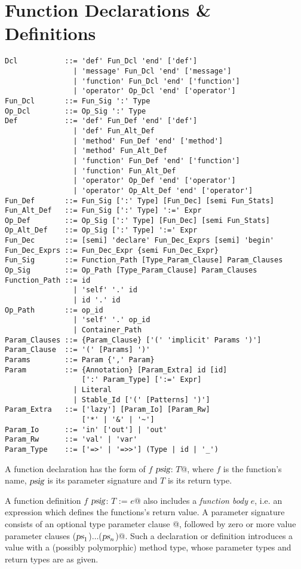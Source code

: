 \section{Function Declarations \& Definitions}
\label{sec:function-decls-defs}

\syntax\begin{lstlisting}
Dcl           ::= 'def' Fun_Dcl 'end' ['def']
                | 'message' Fun_Dcl 'end' ['message']
                | 'function' Fun_Dcl 'end' ['function']
                | 'operator' Op_Dcl 'end' ['operator']
Fun_Dcl       ::= Fun_Sig ':' Type
Op_Dcl        ::= Op_Sig ':' Type
Def           ::= 'def' Fun_Def 'end' ['def']
                | 'def' Fun_Alt_Def
                | 'method' Fun_Def 'end' ['method']
                | 'method' Fun_Alt_Def
                | 'function' Fun_Def 'end' ['function']
                | 'function' Fun_Alt_Def
                | 'operator' Op_Def 'end' ['operator']
                | 'operator' Op_Alt_Def 'end' ['operator']
Fun_Def       ::= Fun_Sig [':' Type] [Fun_Dec] [semi Fun_Stats]
Fun_Alt_Def   ::= Fun_Sig [':' Type] ':=' Expr
Op_Def        ::= Op_Sig [':' Type] [Fun_Dec] [semi Fun_Stats]
Op_Alt_Def    ::= Op_Sig [':' Type] ':=' Expr
Fun_Dec       ::= [semi] 'declare' Fun_Dec_Exprs [semi] 'begin'
Fun_Dec_Exprs ::= Fun_Dec_Expr {semi Fun_Dec_Expr}
Fun_Sig       ::= Function_Path [Type_Param_Clause] Param_Clauses
Op_Sig        ::= Op_Path [Type_Param_Clause] Param_Clauses
Function_Path ::= id
                | 'self' '.' id
                | id '.' id
Op_Path       ::= op_id
                | 'self' '.' op_id
                | Container_Path
Param_Clauses ::= {Param_Clause} ['(' 'implicit' Params ')']
Param_Clause  ::= '(' [Params] ')'
Params        ::= Param {',' Param}
Param         ::= {Annotation} [Param_Extra] id [id]
                  [':' Param_Type] [':=' Expr]
                | Literal
                | Stable_Id ['(' [Patterns] ')']
Param_Extra   ::= ['lazy'] [Param_Io] [Param_Rw] 
                  ['*' | '&' | '~']
Param_Io      ::= 'in' ['out'] | 'out'
Param_Rw      ::= 'val' | 'var'
Param_Type    ::= ['=>' | '=>>'] (Type | id | '_')
\end{lstlisting}

A function declaration has the form of \lstinline@def $f$ $\mbox{\sl psig}$: $T$@, where $f$ is the function's name, $\mbox{\sl psig}$ is its parameter signature and $T$ is its return type. 

A function definition \lstinline@def $f$ $\mbox{\sl psig}$: $T$ := $e$@ also includes a {\em function body} $e$, i.e. an expression which defines the functions's return value. A parameter signature consists of an optional type parameter clause \lstinline@[$\tps$]@, followed by zero or more value parameter clauses \lstinline@($\mbox{\sl ps}_1$)$\ldots$($\mbox{\sl ps}_n$)@. Such a declaration or definition introduces a value with a (possibly polymorphic) method type, whose parameter types and return types are as given. 

